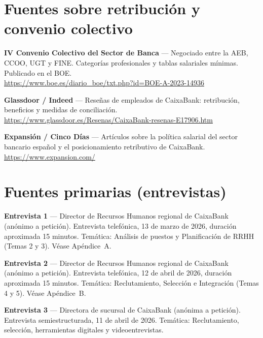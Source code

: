 \section*{Fuentes sobre retribución y convenio colectivo}

\begin{enumerate}[label={[\arabic*]}, resume]

  \item \textbf{IV Convenio Colectivo del Sector de Banca} --- Negociado entre
        la AEB, CCOO, UGT y FINE. Categorías profesionales y tablas salariales
        mínimas. Publicado en el BOE.\\
        \url{https://www.boe.es/diario_boe/txt.php?id=BOE-A-2023-14936} %

  \item \textbf{Glassdoor / Indeed} --- Reseñas de empleados de CaixaBank:
        retribución, beneficios y medidas de conciliación.\\
        \url{https://www.glassdoor.es/Resenas/CaixaBank-resenas-E17906.htm}

  \item \textbf{Expansión / Cinco Días} --- Artículos sobre la política salarial
        del sector bancario español y el posicionamiento retributivo de CaixaBank.\\
        \url{https://www.expansion.com/}

\end{enumerate}

\section*{Fuentes primarias (entrevistas)}

\begin{enumerate}[label={[\arabic*]}, resume]

  \item \textbf{Entrevista 1} --- Director de Recursos Humanos regional de CaixaBank
        (anónimo a petición). Entrevista telefónica, 13 de marzo de 2026,
        duración aproximada 15 minutos. Temática: Análisis de puestos y
        Planificación de RRHH (Temas 2 y 3). Véase Apéndice~A.

  \item \textbf{Entrevista 2} --- Director de Recursos Humanos regional de CaixaBank
        (anónimo a petición). Entrevista telefónica, 12 de abril de 2026,
        duración aproximada 15 minutos. Temática: Reclutamiento, Selección
        e Integración (Temas 4 y 5). Véase Apéndice~B.

  \item \textbf{Entrevista 3} --- Directora de sucursal de CaixaBank
        (anónima a petición). Entrevista semiestructurada, 11 de abril de 2026.
        Temática: Reclutamiento, selección, herramientas digitales y videoentrevistas.

\end{enumerate}

